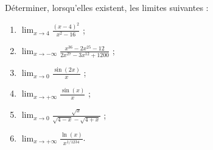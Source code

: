 
\begin{exercice}\label{exoDS2010-1-0003}

Déterminer, lorsqu'elles existent, les limites suivantes :
\begin{enumerate}
\item 
  $\displaystyle \lim_{x\to 4} \frac{(x-4)^2}{x^2-16}$ ;
  \item
    $\displaystyle \lim_{x\to -\infty}\frac{x^{36}-2x^{25}-12}{2x^{27}-3x^{12}+1200}$ ;
    \item
      $\displaystyle \lim_{x\to 0}\frac{\sin (2x)}{x}$ ;
      \item
        $\displaystyle \lim_{x\to +\infty}\frac{\sin (x)}{x}$ ;
        \item
          $\displaystyle \lim_{x\to 0}\frac{\sqrt{x}}{\sqrt{4-x}-\sqrt{4+x}}$ ;
          \item
          $\displaystyle \lim_{x\to +\infty}\frac{\ln(x)}{x^{1/1234}}$.
          
\end{enumerate}

\end{exercice}
